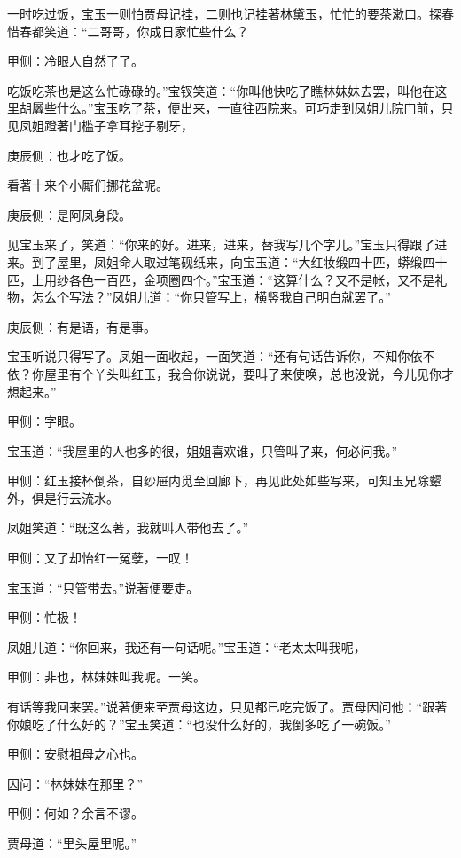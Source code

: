\begin{parag}
    一时吃过饭，宝玉一则怕贾母记挂，二则也记挂著林黛玉，忙忙的要茶漱口。探春惜春都笑道：“二哥哥，你成日家忙些什么？\begin{note}甲侧：冷眼人自然了了。\end{note}吃饭吃茶也是这么忙碌碌的。”宝钗笑道：“你叫他快吃了瞧林妹妹去罢，叫他在这里胡羼些什么。”宝玉吃了茶，便出来，一直往西院来。可巧走到凤姐儿院门前，只见凤姐蹬著门槛子拿耳挖子剔牙，\begin{note}庚辰侧：也才吃了饭。\end{note}看著十来个小厮们挪花盆呢。\begin{note}庚辰侧：是阿凤身段。\end{note}见宝玉来了，笑道：“你来的好。进来，进来，替我写几个字儿。”宝玉只得跟了进来。到了屋里，凤姐命人取过笔砚纸来，向宝玉道：“大红妆缎四十匹，蟒缎四十匹，上用纱各色一百匹，金项圈四个。”宝玉道：“这算什么？又不是帐，又不是礼物，怎么个写法？”凤姐儿道：“你只管写上，横竖我自己明白就罢了。”\begin{note}庚辰侧：有是语，有是事。\end{note}宝玉听说只得写了。凤姐一面收起，一面笑道：“还有句话告诉你，不知你依不依？你屋里有个丫头叫红玉，我合你说说，要叫了来使唤，总也没说，今儿见你才想起来。”\begin{note}甲侧：字眼。\end{note}宝玉道：“我屋里的人也多的很，姐姐喜欢谁，只管叫了来，何必问我。”\begin{note}甲侧：红玉接杯倒茶，自纱屉内觅至回廊下，再见此处如些写来，可知玉兄除颦外，俱是行云流水。\end{note}凤姐笑道：“既这么著，我就叫人带他去了。”\begin{note}甲侧：又了却怡红一冤孽，一叹！\end{note}宝玉道：“只管带去。”说著便要走。\begin{note}甲侧：忙极！\end{note}凤姐儿道：“你回来，我还有一句话呢。”宝玉道：“老太太叫我呢，\begin{note}甲侧：非也，林妹妹叫我呢。一笑。\end{note}有话等我回来罢。”说著便来至贾母这边，只见都已吃完饭了。贾母因问他：“跟著你娘吃了什么好的？”宝玉笑道：“也没什么好的，我倒多吃了一碗饭。”\begin{note}甲侧：安慰祖母之心也。\end{note}因问：“林妹妹在那里？”\begin{note}甲侧：何如？余言不谬。\end{note}贾母道：“里头屋里呢。”
\end{parag}


